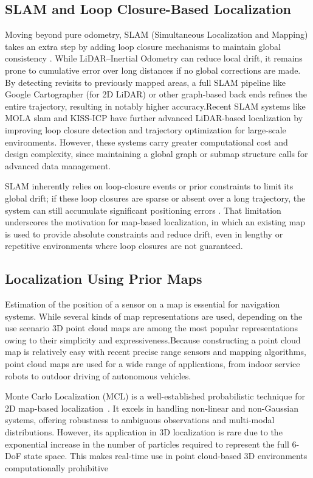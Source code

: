 \subsection{SLAM and Loop Closure-Based Localization}
Moving beyond pure odometry, SLAM (Simultaneous Localization and Mapping) takes an extra step by adding loop closure mechanisms to maintain global consistency \cite{cadena2016past}. While LiDAR–Inertial Odometry can reduce local drift, it remains prone to cumulative error over long distances if no global corrections are made. By detecting revisits to previously mapped areas, a full SLAM pipeline like Google Cartographer (for 2D LiDAR) \cite{hess2016real} or other graph‐based back ends \cite{grisetti_gmapping,} refines the entire trajectory, resulting in notably higher accuracy.Recent SLAM systems like MOLA slam \cite{blanco2025mola_lo} and KISS-ICP\cite{kiss2025arxiv} have further advanced LiDAR-based localization by improving loop closure detection and trajectory optimization for large-scale environments. However, these systems carry greater computational cost and design complexity, since maintaining a global graph or submap structure calls for advanced data management.

SLAM inherently relies on loop‐closure events or prior constraints to limit its global drift; if these loop closures are sparse or absent over a long trajectory, the system can still accumulate significant positioning errors \cite{grisetti_gmapping, cadena2016past}. That limitation underscores the motivation for map‐based localization, in which an existing map is used to provide absolute constraints and reduce drift, even in lengthy or repetitive environments where loop closures are not guaranteed.

\subsection{Localization Using Prior Maps}
Estimation of the position of a sensor on a map is essential for navigation systems. While several
kinds of map representations are used, depending on the use scenario 3D point cloud maps are among the most popular representations owing to their simplicity and expressiveness.\cite{koide2024tightly}Because constructing a point cloud map is relatively easy with recent precise range sensors and mapping algorithms, point cloud maps are used for a wide range of applications, from indoor service robots to outdoor driving of autonomous vehicles.


Monte Carlo Localization (MCL) is a well-established probabilistic technique for 2D map-based localization~\cite{thrun2005probabilistic}. It excels in handling non-linear and non-Gaussian systems, offering robustness to ambiguous observations and multi-modal distributions. However, its application in 3D localization is rare due to the exponential increase in the number of particles required to represent the full 6-DoF state space. This makes real-time use in point cloud-based 3D environments computationally prohibitive

